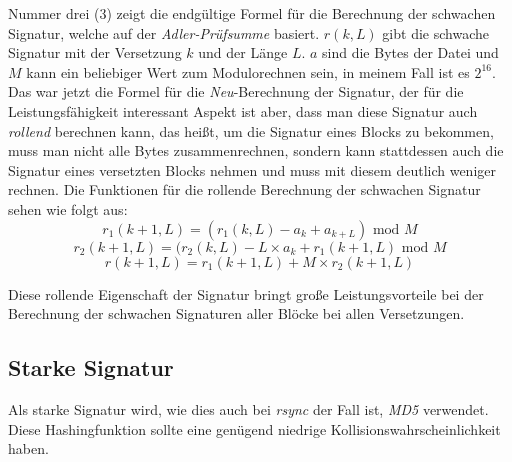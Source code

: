 Nummer drei (3) zeigt die endgültige Formel für die Berechnung der schwachen Signatur, welche auf der \textit{Adler-Prüfsumme} basiert\cite{Tridgell99}.
$r(k,L)$ gibt die schwache Signatur mit der Versetzung $k$ und der Länge $L$. $a$ sind die Bytes der Datei und $M$ kann ein beliebiger Wert zum Modulorechnen sein, in
meinem Fall ist es $2^{16}$. Das war jetzt die Formel für die \emph{Neu}-Berechnung der Signatur, der für die Leistungsfähigkeit interessant Aspekt ist aber, dass
man diese Signatur auch \emph{rollend} berechnen kann, das heißt, um die Signatur eines Blocks zu bekommen, muss man nicht alle Bytes zusammenrechnen, sondern kann
stattdessen auch die Signatur eines versetzten Blocks nehmen und muss mit diesem deutlich weniger rechnen. 
Die Funktionen für die rollende Berechnung der schwachen Signatur sehen wie folgt aus\cite{Tridgell99}:
\begin{equation}
    r_1(k+1,L) = (r_1(k,L)-a_k+a_{k+L}) \textrm{ mod } M 
\end{equation}
\begin{equation}
    r_2(k+1,L) = (r_2(k,L)-L \times a_k+r_1(k+1,L) \textrm{ mod } M 
\end{equation}
\begin{equation}
    r(k+1,L) = r_1(k+1,L) + M \times r_2(k+1,L)
\end{equation}

Diese rollende Eigenschaft der Signatur bringt große Leistungsvorteile bei der Berechnung der schwachen Signaturen aller Blöcke bei allen Versetzungen.

\subsection{Starke Signatur}

Als starke Signatur wird, wie dies auch bei \textit{rsync} der Fall ist, \textit{MD5} verwendet\cite{rsync}. Diese Hashingfunktion sollte eine genügend niedrige
Kollisionswahrscheinlichkeit haben.

